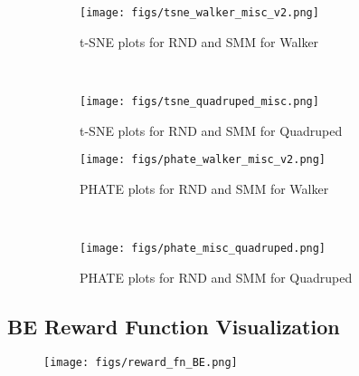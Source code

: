 \begin{figure}[ht]
    \begin{subfigure}[b]{0.48\textwidth}
        \texttt{[image: figs/tsne\_walker\_misc\_v2.png]}
        \caption{t-SNE plots for RND and SMM for Walker}
        \label{fig:tsne_misc_walker_full}
    \end{subfigure}
    \centering
    ~
    \begin{subfigure}[b]{0.48\textwidth}
        \texttt{[image: figs/tsne\_quadruped\_misc.png]}
        \caption{t-SNE plots for RND and SMM for Quadruped}
        \label{fig:tsne_misc_quadruped_full}
    \end{subfigure}

    \begin{subfigure}[b]{0.48\textwidth}
        \texttt{[image: figs/phate\_walker\_misc\_v2.png]}
        \caption{PHATE plots for RND and SMM for Walker}
        \label{fig:phate_misc_walker_full}
    \end{subfigure}
    \centering
    ~
    \begin{subfigure}[b]{0.48\textwidth}
        \texttt{[image: figs/phate\_misc\_quadruped.png]}
        \caption{PHATE plots for RND and SMM for Quadruped}
        \label{fig:phate_misc_quadruped_full}
    \end{subfigure}
    \caption{}
    \label{fig:smm_rnd_full}

\end{figure}



\newpage
\subsection{BE Reward Function Visualization}
%
\begin{figure}[ht]
    \centering
    \texttt{[image: figs/reward\_fn\_BE.png]}
    \caption{  }
    \label{fig:be_rwrd_fn}
\end{figure}



